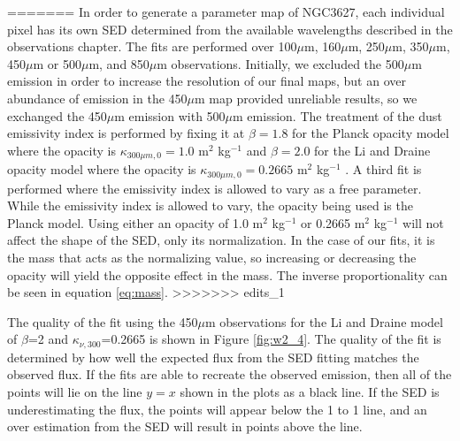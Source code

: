 =======
In order to generate a parameter map of NGC3627, each individual pixel has its own SED determined from the available wavelengths described in the observations chapter.  The fits are performed over 100$\mu$m, 160$\mu$m, 250$\mu$m, 350$\mu$m, 450$\mu$m or 500$\mu$m, and 850$\mu$m observations.  Initially, we excluded the 500$\mu$m emission in order to increase the resolution of our final maps, but an over abundance of emission in the 450$\mu$m map provided unreliable results, so we exchanged the 450$\mu$m emission with 500$\mu$m emission.  The treatment of the dust emissivity index is performed by fixing it at $\beta=1.8$ for the Planck opacity model where the opacity is $\kappa_{300\mu m,0}=1.0$ m$^2$ kg$^{-1}$ \citep{planckxxv2011} and $\beta=2.0$ for the Li and Draine opacity model where the opacity is $\kappa_{300\mu m,0}=0.2665$ m$^2$ kg$^{-1}$ \citep{li2001}.  A third fit is performed where the emissivity index is allowed to vary as a free parameter.  While the emissivity index is allowed to vary, the opacity being used is the Planck model.  Using either an opacity of 1.0 m$^2$ kg$^{-1}$ or 0.2665 m$^2$ kg$^{-1}$ will not affect the shape of the SED, only its normalization.  In the case of our fits, it is the mass that acts as the normalizing value, so increasing or decreasing the opacity will yield the opposite effect in the mass.  The inverse proportionality can be seen in equation \ref{eq:mass}.  
>>>>>>> edits_1

The quality of the fit using the 450$\mu$m observations for the Li and Draine model of $\beta$=2 and $\kappa_{\nu,300}$=0.2665 is shown in Figure \ref{fig:w2_4}.  The quality of the fit is determined by how well the expected flux from the SED fitting matches the observed flux.  If the fits are able to recreate the observed emission, then all of the points will lie on the line $y=x$ shown in the plots as a black line.  If the SED is underestimating the flux, the points will appear below the 1 to 1 line, and an over estimation from the SED will result in points above the line.  

